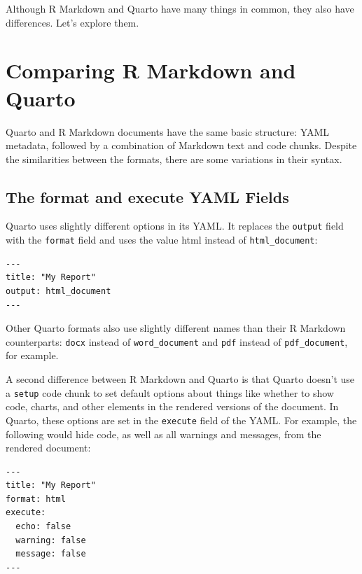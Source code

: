 \documentclass[
]{book}
\begin{document}
Although R Markdown and Quarto have many things in common, they also have differences. Let's explore them.

\hypertarget{comparing-r-markdown-and-quarto}{%
\section*{Comparing R Markdown and Quarto}\label{comparing-r-markdown-and-quarto}}

Quarto and R Markdown documents have the same basic structure: YAML metadata, followed by a combination of Markdown text and code chunks. Despite the similarities between the formats, there are some variations in their syntax.

\hypertarget{the-format-and-execute-yaml-fields}{%
\subsection*{The format and execute YAML Fields}\label{the-format-and-execute-yaml-fields}}

Quarto uses slightly different options in its YAML. It replaces the \texttt{output} field with the \texttt{format} field and uses the value html instead of \texttt{html\_document}:

\begin{verbatim}
---
title: "My Report"
output: html_document
---
\end{verbatim}

Other Quarto formats also use slightly different names than their R Markdown counterparts: \texttt{docx} instead of \texttt{word\_document} and \texttt{pdf} instead of \texttt{pdf\_document}, for example.

A second difference between R Markdown and Quarto is that Quarto doesn't use a \texttt{setup} code chunk to set default options about things like whether to show code, charts, and other elements in the rendered versions of the document. In Quarto, these options are set in the \texttt{execute} field of the YAML. For example, the following would hide code, as well as all warnings and messages, from the rendered document:

\begin{verbatim}
---
title: "My Report"
format: html
execute:
  echo: false
  warning: false
  message: false
---
\end{verbatim}
\end{document}
